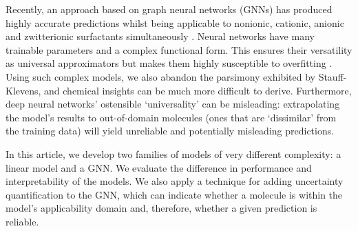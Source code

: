 Recently, an approach based on graph neural networks (GNNs) has produced highly accurate predictions whilst being applicable to nonionic, cationic, anionic and zwitterionic surfactants simultaneously
\cite{qinPredictingCriticalMicelle2021}. Neural networks have many trainable parameters and a complex functional form. This ensures their versatility as universal approximators but makes them highly susceptible to overfitting \cite{bejaniSystematicReviewOverfitting2021}. Using such complex models, we also abandon the parsimony exhibited by Stauff-Klevens, and chemical insights can be much more difficult to derive. Furthermore, deep neural networks' ostensible `universality' can be misleading: extrapolating the model's results to out-of-domain molecules (ones that are `dissimilar' from the training data) will yield unreliable and potentially misleading predictions.

In this article, we develop two families of models of very different complexity: a linear model and a GNN. We evaluate the difference in performance and interpretability of the models. We also apply a technique for adding uncertainty
quantification to the GNN, which can indicate whether a molecule is within the model's applicability domain and, therefore, whether a given prediction is reliable.
